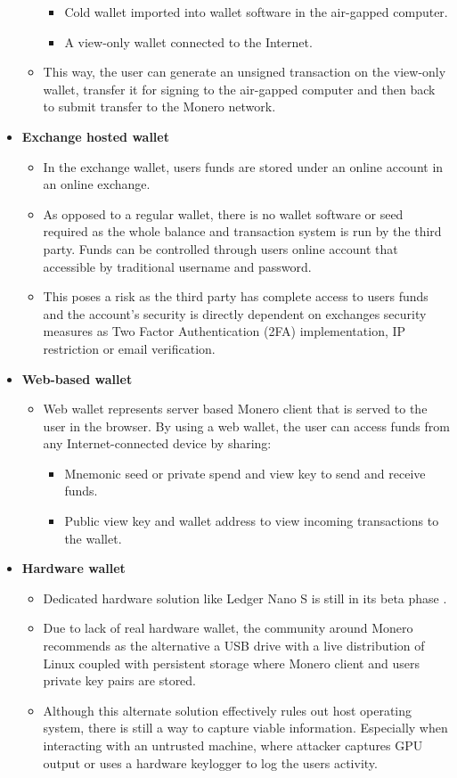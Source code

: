 \documentclass[
  printed, %
  table,   %
  lof,     %
  lot,     %
           oneside, color
]{fithesis3}
\begin{document}
\begin{itemize}
\begin{itemize}
\begin{itemize}\itemsep0em
\item Cold wallet imported into wallet software in the air-gapped computer.
\item A view-only wallet connected to the Internet. 
\end{itemize}
\item This way, the user can generate an unsigned transaction on the view-only wallet, transfer it for signing to the air-gapped computer and then back to submit transfer to the Monero network.
\end{itemize}
\item \textbf{Exchange hosted wallet}
\begin{itemize}\itemsep0em
\item In the exchange wallet, users funds are stored under an online account in an online exchange. 
\item As opposed to a regular wallet, there is no wallet software or seed required as the whole balance and transaction system is run by the third party.
Funds can be controlled through users online account that accessible by traditional username and password. 
\item This poses a risk as the third party has complete access to users funds and the account's security is directly dependent on exchanges security measures as Two Factor Authentication (2FA) implementation, IP restriction or email verification.
\end{itemize}
\item \textbf{Web-based wallet}
\begin{itemize}\itemsep0em
\item Web wallet represents server based Monero client that is served to the user in the browser. By using a web wallet, the user can access funds from any Internet-connected device by sharing:
\begin{itemize}\itemsep0em
\item Mnemonic seed or private spend and view key to send and receive funds.
\item Public view key and wallet address to view incoming transactions to the wallet.
\end{itemize}
\end{itemize}
\item \textbf{Hardware wallet}
\begin{itemize}\itemsep0em
\item Dedicated hardware solution like Ledger Nano S is still in its beta phase \cite{ledgermonero}.
\item Due to lack of real hardware wallet, the community around Monero recommends as the alternative a USB drive with a live distribution of Linux coupled with persistent storage where Monero client and users private key pairs are stored. 
\item Although this alternate solution effectively rules out host operating system, there is still a way to capture viable information. Especially when interacting with an untrusted machine, where attacker captures GPU output or uses a hardware keylogger to log the users activity.


\end{itemize}
\end{itemize}
\end{document}
